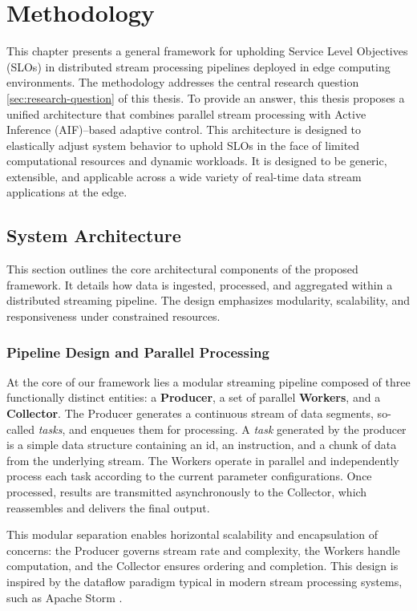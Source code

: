\chapter{Methodology}
\label{chap:methodology}

This chapter presents a general framework for upholding Service Level Objectives (SLOs) in distributed stream processing pipelines deployed in edge computing environments. The methodology addresses the central research question \ref{sec:research-question} of this thesis. To provide an answer, this thesis proposes a unified architecture that combines parallel stream processing with Active Inference (AIF)–based adaptive control. This architecture is designed to elastically adjust system behavior to uphold SLOs in the face of limited computational resources and dynamic workloads. It is designed to be generic, extensible, and applicable across a wide variety of real-time data stream applications at the edge.

\section{System Architecture}
This section outlines the core architectural components of the proposed framework. It details how data is ingested, processed, and aggregated within a distributed streaming pipeline. The design emphasizes modularity, scalability, and responsiveness under constrained resources.

\subsection{Pipeline Design and Parallel Processing}
At the core of our framework lies a modular streaming pipeline composed of three functionally distinct entities: a\textbf{ Producer}, a set of parallel \textbf{Workers}, and a \textbf{
Collector}. The Producer generates a continuous stream of data segments, so-called \textit{tasks}, and enqueues them for processing. A \textit{task} generated by the producer is a simple data structure containing an id, an instruction, and a chunk of data from the underlying stream. The Workers operate in parallel and independently process each task according to the current parameter configurations. Once processed, results are transmitted asynchronously to the Collector, which reassembles and delivers the final output. 

This modular separation enables horizontal scalability and encapsulation of concerns: the Producer governs stream rate and complexity, the Workers handle computation, and the Collector ensures ordering and completion. This design is inspired by the dataflow paradigm typical in modern stream processing systems, such as Apache Storm \cite{carbone_apache_2015, noauthor_apache_nodate}. 

